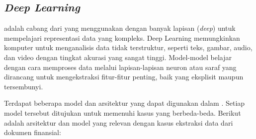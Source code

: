 \subsection{\emph{Deep Learning}}
\label{subsec:dl}

\dlfl{} adalah cabang dari \ml{} yang menggunakan \annfull{} dengan banyak lapisan (\emph{deep}) untuk mempelajari representasi data yang kompleks. Deep Learning memungkinkan komputer untuk menganalisis data tidak terstruktur, seperti teks, gambar, audio, dan video dengan tingkat akurasi yang sangat tinggi. Model-model \dl{} belajar dengan cara memproses data melalui lapisan-lapisan neuron atau saraf yang dirancang untuk mengekstraksi fitur-fitur penting, baik yang eksplisit maupun tersembunyi. \parencite{Goodfellow-et-al-2016}

Terdapat beberapa model dan arsitektur yang dapat digunakan dalam \dl. Setiap model tersebut ditujukan untuk memenuhi kasus yang berbeda-beda. Berikut adalah arsitektur dan model yang relevan dengan kasus ekstraksi data dari dokumen finansial:

